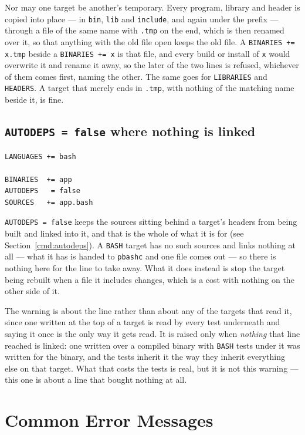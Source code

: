 \documentclass{article}
\begin{document}
Nor may one target be another's temporary.  Every program, library
and header is copied into place --- in \texttt{bin}, \texttt{lib} and
\texttt{include}, and again under the prefix --- through a file of the
same name with \texttt{.tmp} on the end, which is then renamed over
it, so that anything with the old file open keeps the old file.  A
\texttt{BINARIES += x.tmp} beside a \texttt{BINARIES += x} is that
file, and every build or install of \texttt{x} would overwrite it and
rename it away, so the later of the two lines is refused, whichever
of them comes first, naming the other.  The same goes for
\texttt{LIBRARIES} and \texttt{HEADERS}.  A target that merely ends in
\texttt{.tmp}, with nothing of the matching name beside it, is fine.

\subsection{\texttt{AUTODEPS = false} where nothing is linked}

\begin{verbatim}
LANGUAGES += bash

BINARIES  += app
AUTODEPS   = false
SOURCES   += app.bash
\end{verbatim}

\texttt{AUTODEPS = false} keeps the sources sitting behind a target's
headers from being built and linked into it, and that is the whole of
what it is for (see Section~\ref{cmd:autodeps}).  A \texttt{BASH}
target has no such sources and links nothing at all --- what it has is
handed to \texttt{pbashc} and one file comes out --- so there is
nothing here for the line to take away.  What it does instead is stop
the target being rebuilt when a file it includes changes, which is a
cost with nothing on the other side of it.

The warning is about the line rather than about any of the targets
that read it, since one written at the top of a target is read by
every test underneath and saying it once is the only way it gets
read.  It is raised only when \textit{nothing} that line reached is
linked: one written over a compiled binary with \texttt{BASH} tests
under it was written for the binary, and the tests inherit it the way
they inherit everything else on that target.  What that costs the
tests is real, but it is not this warning --- this one is about a
line that bought nothing at all.

\section{Common Error Messages \label{err}}
\end{document}
